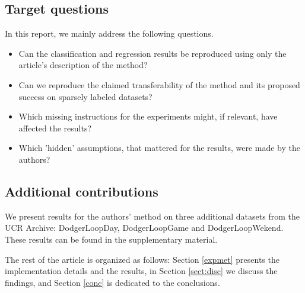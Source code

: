 
\subsection{Target questions}

In this report, we mainly address the following questions.

\begin{itemize}
    \item Can the classification and regression results be reproduced using only the article's description of the method?
    \item Can we reproduce the claimed transferability of the method and its proposed success on sparsely labeled datasets?
    \item Which missing instructions for the experiments might, if relevant, have affected the results?
    \item Which 'hidden' assumptions, that mattered for the results, were made by the authors?
    
\end{itemize}

\subsection{Additional contributions}
We present results for the authors' method on three additional datasets from the UCR Archive: DodgerLoopDay, DodgerLoopGame and DodgerLoopWekend. These results can be found in the supplementary material.

The rest of the article is organized as follows: Section \ref{expmet} presents the implementation details and the results, in Section \ref{sect:disc} we discuss the findings, and Section \ref{conc} is dedicated to the conclusions.

% 


